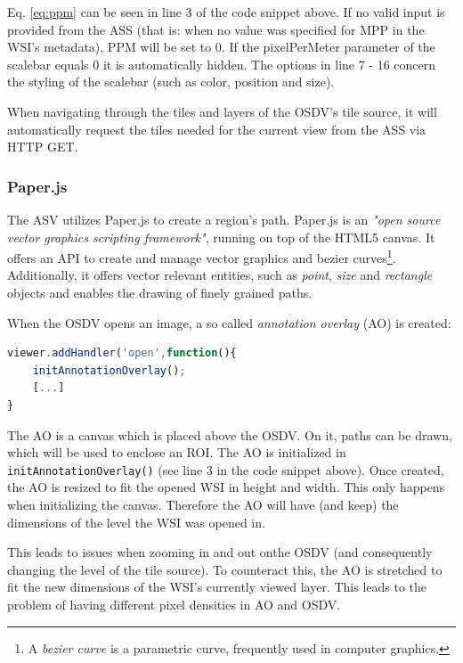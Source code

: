 Eq. \ref{eq:ppm} can be seen in line 3 of the code snippet above.  If no valid input is provided from the ASS (that is: when no value was specified for MPP in the WSI's metadata), PPM will be set to 0. If the pixelPerMeter parameter of the scalebar equals 0 it is automatically hidden\cite{web:openseadragon}. The options in line 7 - 16 concern the styling of the scalebar (such as color, position and size).

When navigating through the tiles and layers of the OSDV's tile source, it will automatically request the tiles needed for the current view from the ASS via HTTP GET\cite{web:openseadragon}.


\subsubsection{Paper.js}
The ASV utilizes Paper.js to create a region's path. Paper.js is an \emph{"open source vector graphics scripting framework"}, running on top of the HTML5 canvas\cite{web:paper}. It offers an API to create and manage vector graphics and bezier curves\footnote{
	A \emph{bezier curve} is a parametric curve, frequently used in computer graphics\cite{Strang03}.
}. Additionally, it offers vector relevant entities, such as \emph{point}, \emph{size} and \emph{rectangle} objects and enables the drawing of finely grained paths.

When the OSDV opens an image, a so called \emph{annotation overlay} (AO) is created:
\begin{lstlisting}[title=Excerpt from \texttt{initAnnotationService()} in as{\textunderscore}viewer.js, frame=single, language=JavaScript]
viewer.addHandler('open',function(){
	initAnnotationOverlay();
	[...]
}
\end{lstlisting}

The AO is a canvas which is placed above the OSDV. On it, paths can be drawn, which will be used to enclose an ROI. The AO is initialized in \texttt{initAnnotationOverlay()} (see line 3 in the code snippet above). Once created, the AO is resized to fit the opened WSI in height and width. This only happens when initializing the canvas. Therefore the AO will have (and keep) the dimensions of the level the WSI was opened in.

This leads to issues when zooming in and out onthe OSDV (and consequently changing the level of the tile source). To counteract this, the AO is stretched to fit the new dimensions of the WSI's currently viewed layer. This leads to the problem of having different pixel densities in AO and OSDV.

